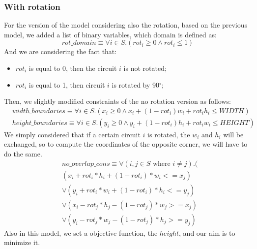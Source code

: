 \subsubsection{With rotation}
For the version of the model considering also the rotation, based on the previous model, we added a list of binary variables, which domain is defined as: 
\begin{equation}
    rot\_domain \equiv \forall{i \in S}.( rot_i \geq 0 \wedge  rot_i \leq 1)
\end{equation}
And we are considering the fact that: 
\begin{itemize}
    \item $rot_i$ is equal to 0, then the circuit $i$ is not rotated;
    \item $rot_i$ is equal to 1, then circuit $i$ is rotated by 90$^{\circ}$;
\end{itemize}
Then, we slightly modified constraints of the no rotation version as follows: 
\begin{align}
   & width\_boundaries \equiv \forall{i \in  S}.(x_i \geq 0  \wedge  x_i +(1-rot_i) w_i+ rot_i h_i \leq \textit{WIDTH})\\
    &height\_boundaries \equiv \forall{i \in  S}.(y_i \geq 0  \wedge  y_i + (1-rot_i)h_i + rot_i w_i \leq \textit{HEIGHT})
\end{align}
We simply considered that if a certain circuit $i$ is rotated, the $w_i$ and $h_i$ will be exchanged, so to compute the coordinates of the opposite corner, we will have to do the same.
\begin{align}
    &no\_overlap\_cons \equiv \forall (i, j \in  S \text{ where } i \neq j).(\\
      &(x_i + rot_i * h_i + (1 - rot_i) * w_i <= x_j) \: \\
     &\lor(y_i + rot_i * w_i + (1 - rot_i) * h_i <= y_j) \: \\
     &\lor(x_i - rot_j * h_j - (1 - rot_j) * w_j >= x_j) \: \\
     &\lor(y_i - rot_j * w_j - (1 - rot_j) * h_j >= y_j)\:
\end{align}
Also in this model, we set a objective function, the $height$, and our aim is to minimize it.


